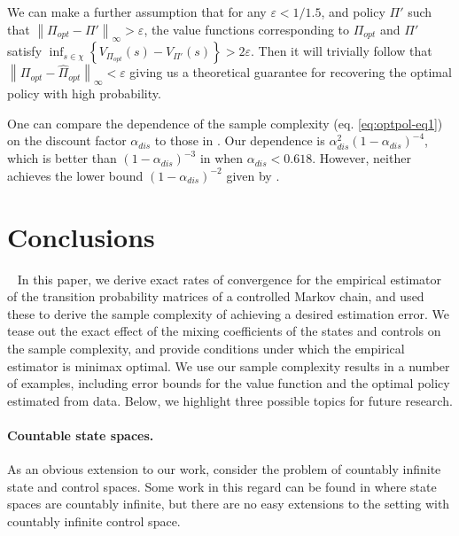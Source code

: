 \documentclass[opre,sglanonrev]{informs4}
\numberwithin{equation}{section}
\newcommand{\lc}{\left\{}
\newcommand{\rc}{\right\}}
\newcommand{\lV}{\left\|}
\newcommand{\rV}{\right\|}
\newcommand\numberthis{\addtocounter{equation}{1}\tag{\theequation}}
\newcommand{\eps}{\varepsilon}
\begin{document}
{{{\begin{remark}
We can  make a further assumption that for any $\eps<1/1.5$, and policy $\Pi'$ such that $\lV \Pi_{opt}-\Pi'\rV_{\infty}>\eps$, the value functions corresponding to $\Pi_{opt}$ and $\Pi'$ satisfy  
$
         \inf_{s\in \chi}\lc V_{\Pi_{opt}}(s)-V_{\Pi'}(s)\rc>{2}\eps.$ %
%        
        Then it will trivially follow that $\lV\Pi_{opt}-\hat\Pi_{opt}\rV_\infty<\eps$ giving us a theoretical guarantee for recovering the optimal policy with high probability. 
\end{remark}

One can compare the dependence of the sample complexity (eq. \ref{eq:optpol-eq1}) on the discount factor $\alpha_{dis}$ to those in \cite{li2022settling}. Our dependence is $\alpha_{dis}^2(1-\alpha_{dis})^{-4}$, which is better than $(1-\alpha_{dis})^{-3}$  in \cite{li2022settling} when $\alpha_{dis}<0.618$. However, neither achieves the lower bound $(1-\alpha_{dis})^{-2}$ given by \cite{agarwal2020model}. }
}}
\section{Conclusions}~\label{sec:conclusions}
In this paper, we derive exact rates of convergence for the empirical estimator of the transition probability matrices of a controlled Markov chain, and used these to derive the sample complexity of achieving a desired estimation error.
We tease out the exact effect of the mixing coefficients of the states and controls on the sample complexity, and provide conditions under which the empirical estimator is minimax optimal. 
We use our sample complexity results in a number of examples, including error bounds for the value function and the optimal policy estimated from data.
Below, we highlight three possible topics for future research.

\paragraph{Countable state spaces.}  As an obvious extension to our work, consider the problem of countably infinite state and control spaces. Some work in this regard can be found in \cite{wolfer2021statistical} where state spaces are countably infinite, but there are no easy extensions to the setting with countably infinite control space.
\end{document}
